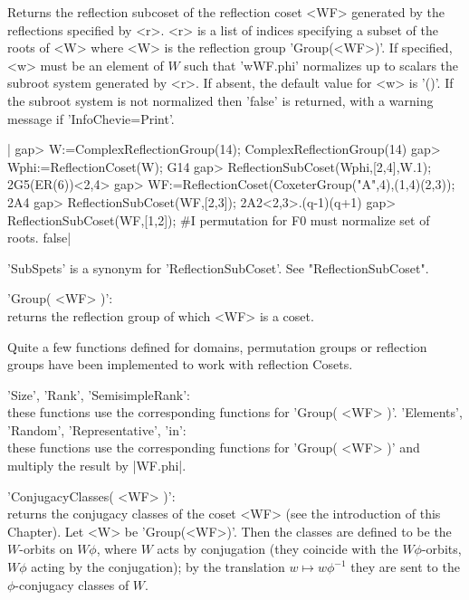 Returns  the reflection subcoset of the  reflection coset <WF> generated by
the  reflections specified by  <r>. <r> is  a list of  indices specifying a
subset of the roots of <W> where <W> is the reflection group 'Group(<WF>)'.
If  specified,  <w>  must  be  an  element  of  $W$  such  that 'w\*WF.phi'
normalizes  up to scalars  the subroot system  generated by <r>. If absent,
the  default value for <w> is '()'. If the subroot system is not normalized
then 'false' is returned, with a warning message if 'InfoChevie=Print'.

|    gap> W:=ComplexReflectionGroup(14);
    ComplexReflectionGroup(14)
    gap> Wphi:=ReflectionCoset(W);
    G14
    gap> ReflectionSubCoset(Wphi,[2,4],W.1);
    2G5(ER(6))<2,4>
    gap> WF:=ReflectionCoset(CoxeterGroup("A",4),(1,4)(2,3));
    2A4
    gap> ReflectionSubCoset(WF,[2,3]);
    2A2<2,3>.(q-1)(q+1)
    gap> ReflectionSubCoset(WF,[1,2]);
    #I permutation for F0 must normalize set of roots.
    false|


'SubSpets' is a synonym for 'ReflectionSubCoset'. See "ReflectionSubCoset".


'Group( <WF> )':\\
     returns the reflection group of which <WF> is a coset.

Quite a few functions defined for domains, permutation groups or reflection
groups have been implemented to work with reflection Cosets.

'Size', 'Rank', 'SemisimpleRank':\\ these functions use the corresponding
     functions for 'Group( <WF> )'.
'Elements', 'Random', 'Representative',  'in':\\  these functions
     use the corresponding functions for 'Group( <WF> )' and multiply the
     result by |WF.phi|.

'ConjugacyClasses(  <WF>  )':\\ returns  the   conjugacy classes  of  the
  coset   <WF>  (see  the  introduction  of   this  Chapter).  Let  <W>  be
  'Group(<WF>)'.  Then the classes  are defined to  be the $W$-orbits on $W
  \phi$,  where  $W$  acts  by  conjugation  (they  coincide  with  the  $W
  \phi$-orbits,  $W \phi$ acting by the conjugation); by the translation $w
  \mapsto w\phi^{-1}$ they are sent to the $\phi$-conjugacy classes of $W$.

